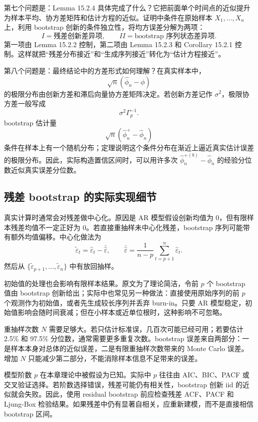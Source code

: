 \documentclass[11pt,a4paper]{ctexart}
\begin{document}
第七个问题是：Lemma 15.2.4 具体完成了什么？它把前面单个时间点的近似提升为样本平均、协方差矩阵和估计方程的近似。证明中条件在原始样本 \(X_1,\ldots,X_n\) 上，利用 bootstrap 创新的条件独立性，将均方误差分解为两项：
\[
  I=\text{残差创新差异项},\qquad
  II=\text{bootstrap 序列状态差异项}.
\]
第一项由 Lemma 15.2.2 控制，第二项由 Lemma 15.2.3 和 Corollary 15.2.1 控制。这样就把“残差分布接近”和“生成序列接近”转化为“估计方程接近”。

第八个问题是：最终结论中的方差形式如何理解？在真实样本中，
\[
  \sqrt n(\hat\phi_n-\phi)
\]
的极限分布由创新方差和滞后向量协方差矩阵决定。若创新方差记作 \(\sigma^2\)，极限协方差一般写成
\[
  \sigma^2\Gamma_p^{-1}.
\]
bootstrap 估计量
\[
  \sqrt n(\hat\phi_n^+-\hat\phi_n)
\]
条件在样本上有一个随机分布；定理说明这个条件分布在渐近上逼近真实估计误差的极限分布。因此，实际构造置信区间时，可以用许多次 \(\hat\phi_n^{+(b)}-\hat\phi_n\) 的经验分位数近似真实误差分位数。

\subsection{残差 bootstrap 的实际实现细节}

真实计算时通常会对残差做中心化。原因是 AR 模型假设创新均值为 0，但有限样本残差均值不一定正好为 0。若直接重抽样未中心化残差，bootstrap 序列可能带有额外均值偏移。中心化做法为
\[
  \tilde\varepsilon_t=\hat\varepsilon_t-\bar{\hat\varepsilon},
  \qquad
  \bar{\hat\varepsilon}=\frac1{n-p}\sum_{t=p+1}^n\hat\varepsilon_t.
\]
然后从 \(\{\tilde\varepsilon_{p+1},\ldots,\tilde\varepsilon_n\}\) 中有放回抽样。

初始值的处理也会影响有限样本结果。原文为了理论简洁，令前 \(p\) 个 bootstrap 值由 bootstrap 创新给出；实际中也常见另一种做法：直接使用原始序列的前 \(p\) 个观测作为初始值，或者先生成较长序列并丢弃 burn-in。只要 AR 模型稳定，初始值影响会随时间衰减；但在小样本或近单位根时，这种影响不可忽略。

重抽样次数 \(N\) 需要足够大。若只估计标准误，几百次可能已经可用；若要估计 2.5\% 和 97.5\% 分位数，通常需要更多重复次数。bootstrap 误差来自两部分：一是样本本身对总体的近似误差，二是有限重抽样次数带来的 Monte Carlo 误差。增加 \(N\) 只能减少第二部分，不能消除样本信息不足带来的误差。

模型阶数 \(p\) 在本章理论中被假设为已知。实际中 \(p\) 往往由 AIC、BIC、PACF 或交叉验证选择。若阶数选择错误，残差可能仍有相关性，bootstrap 创新 iid 的近似就会失败。因此，使用 residual bootstrap 前应检查残差 ACF、PACF 和 Ljung-Box 检验结果。如果残差中仍有显著自相关，应重新建模，而不是直接相信 bootstrap 区间。
\end{document}
